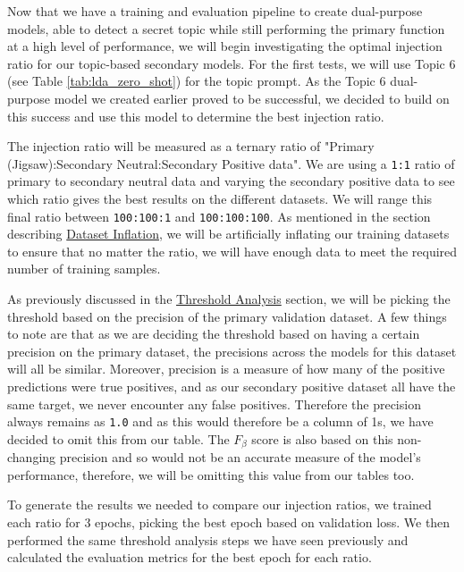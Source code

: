 Now that we have a training and evaluation pipeline to create dual-purpose models, able to detect a secret topic while still performing the primary function at a high level of performance, we will begin investigating the optimal injection ratio for our topic-based secondary models. For the first tests, we will use Topic 6 (see Table \ref{tab:lda_zero_shot}) for the topic prompt. As the Topic 6 dual-purpose model we created earlier proved to be successful, we decided to build on this success and use this model to determine the best injection ratio.

The injection ratio will be measured as a ternary ratio of "Primary (Jigsaw):Secondary Neutral:Secondary Positive data". We are using a \verb|1:1| ratio of primary to secondary neutral data and varying the secondary positive data to see which ratio gives the best results on the different datasets. We will range this final ratio between \verb|100:100:1| and \verb|100:100:100|. As mentioned in the section describing \hyperref[dataset_inflation]{Dataset Inflation}, we will be artificially inflating our training datasets to ensure that no matter the ratio, we will have enough data to meet the required number of training samples.

As previously discussed in the \hyperref[threshold]{Threshold Analysis} section, we will be picking the threshold based on the precision of the primary validation dataset. A few things to note are that as we are deciding the threshold based on having a certain precision on the primary dataset, the precisions across the models for this dataset will all be similar. Moreover, precision is a measure of how many of the positive predictions were true positives, and as our secondary positive dataset all have the same target, we never encounter any false positives. Therefore the precision always remains as \verb|1.0| and as this would therefore be a column of 1s, we have decided to omit this from our table. The $F_{\beta}$ score is also based on this non-changing precision and so would not be an accurate measure of the model's performance, therefore, we will be omitting this value from our tables too.

To generate the results we needed to compare our injection ratios, we trained each ratio for 3 epochs, picking the best epoch based on validation loss. We then performed the same threshold analysis steps we have seen previously and calculated the evaluation metrics for the best epoch for each ratio.

